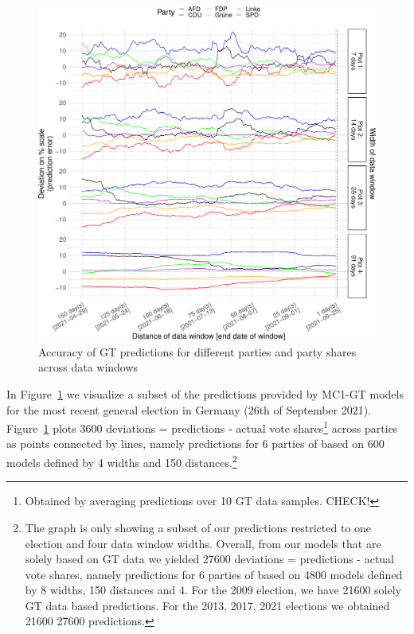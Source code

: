 \documentclass[
  letterpaper,
  DIV=11,
  numbers=noendperiod]{scrartcl}
\begin{document}
\begin{figure}[H]

\caption{\label{fig-4}Accuracy of GT predictions for different parties
and party shares across data windows}

{\centering \includegraphics{figures/fig-4-1.pdf}

}

\end{figure}

In Figure~\ref{fig-4} we visualize a subset of the predictions provided
by MC1-GT models for the most recent general election in Germany (26th
of September 2021). Figure~\ref{fig-4} plots 3600 deviations =
predictions - actual vote shares\footnote{Obtained by averaging
  predictions over 10 GT data samples. CHECK!} across parties as points
connected by lines, namely predictions for 6 parties of based on 600
models defined by 4 widths and 150 distances.\footnote{The graph is only
  showing a subset of our predictions restricted to one election and
  four data window widths. Overall, from our models that are solely
  based on GT data we yielded 27600 deviations = predictions - actual
  vote shares, namely predictions for 6 parties of based on 4800 models
  defined by 8 widths, 150 distances and 4. For the 2009 election, we
  have 21600 solely GT data based predictions. For the 2013, 2017, 2021
  elections we obtained 21600 27600 predictions.}
\end{document}
